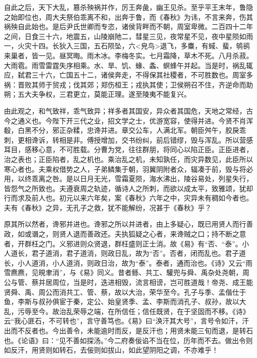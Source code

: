 \documentclass[]{article}
\begin{document}
自此之后，天下大乱，篡杀殃祸并作，厉王奔彘，幽王见杀。至乎平王末年，鲁隐之始即位也，周大夫祭伯乖离不和，出奔于鲁，而《春秋》为讳，不言来奔，伤其祸殃自此始也。是后尹氏世卿而专恣，诸侯背畔而不朝，周室卑微。二百四十二年之间，日食三十六，地震五，山陵崩阤二，彗星三见，夜常星不见，夜中星陨如雨一，火灾十四。长狄入三国，五石陨坠，六\textless{}皃鸟\textgreater{}退飞，多麋，有蜮、蜚，鸲鹆来巢者，皆一见。昼冥晦。雨木冰。李梅冬实。七月霜降，草木不死。八月杀菽。大雨雹。雨雪雷霆失序相乘。水、旱、饥、蝝、螽、螟蜂午并起。当是时，祸乱辄应，弑君三十六，亡国五十二，诸侯奔走，不得保其社稷者，不可胜数也。周室多祸：晋败其师于贸戎；伐其郊；郑伤桓王；戎执其使；卫侯朔召不住，齐逆命而助朔；五大夫争权，三君更立，莫能正理。遂至陵夷不能复兴。

由此观之，和气致祥，乖气致异；祥多者其国安，异众者其国危，天地之常经，古今之通义也。今陛下开三代之业，招文学之士，优游宽容，使得并进。今贤不肖浑殽，白黑不分，邪正杂糅，忠谗并进。章交公车，人满北军。朝臣舛午，胶戾乖刺，更相谗诉，转相是非。傅授增加，交书纷纠，前后错缪，毁与浑乱。所以营感耳目，感移心意，不可胜载。分曹为党，往往群朋，将同心以陷正臣。正臣进者，治之表也；正臣陷者，乱之机也。乘治乱之机，未知孰任，而灾异数见，此臣所以寒心者也。夫乘权借势之人，子弟鳞集于朝，羽翼阴附者众，辐凑于前，毁与将必用，以终乖离之咎。是以日月无光，雪霜夏陨，海水沸出，陵谷易处，列星失行，皆怨气之所致也。夫遵衰周之轨迹，循诗人之所刺，而欲以成太平，致雅颂，犹却行而求及前人也。初元以来六年矣，案《春秋》六年之中，灾异未有稠如今者也。夫有《春秋》之异，无孔子之救，犹不能解纷，况甚于《春秋》乎？

原其所以然者，谗邪并进也。谗邪之所以并进者，由上多疑心，既已用贤人而行善政，如或谮之，则贤人退而善政还。夫执狐疑之心者，来谗贼之口；持不断之意者，开群枉之门。义邪进则众贤退，群枉盛则正士消。故《易》有``否、``泰''。小人道长，君子道消，君子道消，则政日乱，故为``否''。否者，闭而乱也。君子道长，小人道消，小人道消，则政日治，故为``泰''。泰者，通而治也。《诗》又云``雨雪麃麃，见晛聿消''，与《易》同义。昔者鲧、共工、驩兜与舜、禹杂处尧朝，周公与管、蔡并居周位，当是时，迭进相毁，流言相谤，岂可胜道哉！帝尧、成王能贤舜、禹、周公而消共工、管、蔡，故以大治，荣华至今。孔子与季、孟偕仕于鱼，李斯与叔孙俱宦于秦，定公、始皇贤季、孟、李斯而消孔子、叔孙，故以大乱，污辱至今。故治乱荣辱之端，在所信任；信任既贤，在于坚固而不移。《诗》云``我心匪石，不可转也''，言守善笃也。《易》曰``涣汗其大号''，言号令如汗，汗出而不反者也。今出善令，未能逾时而反，是反汗也；用贤未能三旬而退，是转石也。《论语》曰：``见不善如探汤。''今二府奏佞谄不当在位，历年而不去。做出令则如反汗，用贤则如转石，去佞则如拔山，如此望阴阳之调，不亦难乎！
\end{document}
